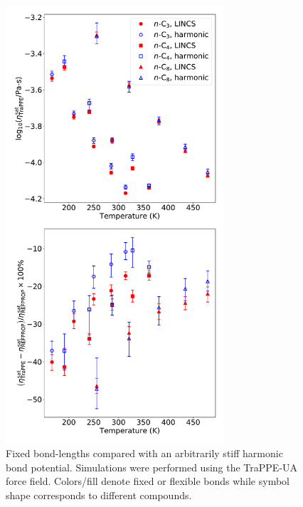 \documentclass[preprint,review,11pt]{elsarticle}
\begin{document}
	\begin{figure}[htb!]
		\centering
		\includegraphics[width=3.2in]{nAlkanes_TraPPE_BondType.pdf}
		\caption{Fixed bond-lengths compared with an arbitrarily stiff harmonic bond potential. Simulations were performed using the TraPPE-UA force field. Colors/fill denote fixed or flexible bonds while symbol shape corresponds to different compounds.}
		\label{fig:fixed_flexible}
	\end{figure} 

%	
%	
	
\end{document}
